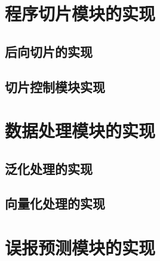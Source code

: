 \section{程序切片模块的实现}

\subsection{后向切片的实现}






\subsection{切片控制模块实现}





\section{数据处理模块的实现}

\subsection{泛化处理的实现}

\subsection{向量化处理的实现}


\section{误报预测模块的实现}

